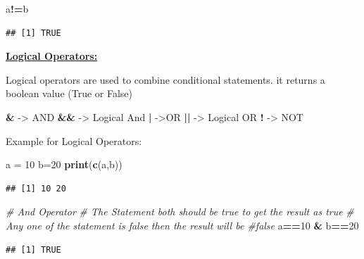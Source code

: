 \documentclass[
]{article}
\newenvironment{Shaded}{\begin{snugshade}}{\end{snugshade}}
\newcommand{\CommentTok}[1]{\textcolor[rgb]{0.56,0.35,0.01}{\textit{#1}}}
\newcommand{\DecValTok}[1]{\textcolor[rgb]{0.00,0.00,0.81}{#1}}
\newcommand{\FunctionTok}[1]{\textcolor[rgb]{0.13,0.29,0.53}{\textbf{#1}}}
\newcommand{\NormalTok}[1]{#1}
\newcommand{\OtherTok}[1]{\textcolor[rgb]{0.56,0.35,0.01}{#1}}
\newcommand{\SpecialCharTok}[1]{\textcolor[rgb]{0.81,0.36,0.00}{\textbf{#1}}}
\begin{document}
\begin{Shaded}
\begin{Highlighting}[]
\NormalTok{a}\SpecialCharTok{!=}\NormalTok{b}
\end{Highlighting}
\end{Shaded}

\begin{verbatim}
## [1] TRUE
\end{verbatim}

\newpage

\ul{\textbf{Logical Operators:}}

Logical operators are used to combine conditional statements. it returns
a boolean value (True or False)

\begin{Shaded}
\begin{Highlighting}[]
\SpecialCharTok{\&} \OtherTok{{-}\textgreater{}}\NormalTok{ AND}
\SpecialCharTok{\&\&} \OtherTok{{-}\textgreater{}}\NormalTok{ Logical And}
\SpecialCharTok{|} \OtherTok{{-}\textgreater{}}\NormalTok{OR}
\SpecialCharTok{||} \OtherTok{{-}\textgreater{}}\NormalTok{ Logical OR}
\SpecialCharTok{!} \OtherTok{{-}\textgreater{}}\NormalTok{ NOT}
\end{Highlighting}
\end{Shaded}

Example for Logical Operators:

\begin{Shaded}
\begin{Highlighting}[]
\NormalTok{a }\OtherTok{=} \DecValTok{10}
\NormalTok{b}\OtherTok{=}\DecValTok{20}
\FunctionTok{print}\NormalTok{(}\FunctionTok{c}\NormalTok{(a,b))}
\end{Highlighting}
\end{Shaded}

\begin{verbatim}
## [1] 10 20
\end{verbatim}

\begin{Shaded}
\begin{Highlighting}[]
\CommentTok{\# And Operator}
\CommentTok{\# The Statement both should be true to get the result as true}
\CommentTok{\# Any one of the statement is false then the result will be \#false}
\NormalTok{a}\SpecialCharTok{==}\DecValTok{10} \SpecialCharTok{\&}\NormalTok{ b}\SpecialCharTok{==}\DecValTok{20}
\end{Highlighting}
\end{Shaded}

\begin{verbatim}
## [1] TRUE
\end{verbatim}
\end{document}
